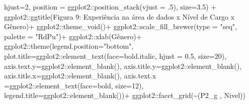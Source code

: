 \documentclass[
]{article}
\newenvironment{Shaded}{\begin{snugshade}}{\end{snugshade}}
\newcommand{\AttributeTok}[1]{\textcolor[rgb]{0.77,0.63,0.00}{#1}}
\newcommand{\DecValTok}[1]{\textcolor[rgb]{0.00,0.00,0.81}{#1}}
\newcommand{\FloatTok}[1]{\textcolor[rgb]{0.00,0.00,0.81}{#1}}
\newcommand{\FunctionTok}[1]{\textcolor[rgb]{0.00,0.00,0.00}{#1}}
\newcommand{\NormalTok}[1]{#1}
\newcommand{\SpecialCharTok}[1]{\textcolor[rgb]{0.00,0.00,0.00}{#1}}
\newcommand{\StringTok}[1]{\textcolor[rgb]{0.31,0.60,0.02}{#1}}
\begin{document}
\begin{Shaded}
\begin{Highlighting}[]
    \AttributeTok{hjust=}\DecValTok{2}\NormalTok{,}
    \AttributeTok{position =}\NormalTok{ ggplot2}\SpecialCharTok{::}\FunctionTok{position\_stack}\NormalTok{(}\AttributeTok{vjust =}\NormalTok{ .}\DecValTok{5}\NormalTok{),}
    \AttributeTok{size=}\FloatTok{3.5}\NormalTok{) }\SpecialCharTok{+}
\NormalTok{  ggplot2}\SpecialCharTok{::}\FunctionTok{ggtitle}\NormalTok{(}\StringTok{\textquotesingle{}Figura 9: Experiência na área de dados x Nível de Cargo x Gênero\textquotesingle{}}\NormalTok{)}\SpecialCharTok{+}
\NormalTok{  ggplot2}\SpecialCharTok{::}\FunctionTok{theme\_void}\NormalTok{()}\SpecialCharTok{+}
\NormalTok{  ggplot2}\SpecialCharTok{::}\FunctionTok{scale\_fill\_brewer}\NormalTok{(}\AttributeTok{type =} \StringTok{"seq"}\NormalTok{, }\AttributeTok{palette =} \StringTok{"RdPu"}\NormalTok{)}\SpecialCharTok{+}
\NormalTok{  ggplot2}\SpecialCharTok{::}\FunctionTok{xlab}\NormalTok{(}\StringTok{\textquotesingle{}Gênero\textquotesingle{}}\NormalTok{)}\SpecialCharTok{+}
\NormalTok{  ggplot2}\SpecialCharTok{::}\FunctionTok{theme}\NormalTok{(}\AttributeTok{legend.position=}\StringTok{"bottom"}\NormalTok{,}
                 \AttributeTok{plot.title=}\NormalTok{ggplot2}\SpecialCharTok{::}\FunctionTok{element\_text}\NormalTok{(}\AttributeTok{face=}\StringTok{\textquotesingle{}bold.italic\textquotesingle{}}\NormalTok{,}
                                                  \AttributeTok{hjust =} \FloatTok{0.5}\NormalTok{, }\AttributeTok{size=}\DecValTok{20}\NormalTok{),}
                 \AttributeTok{axis.text.y=}\NormalTok{ggplot2}\SpecialCharTok{::}\FunctionTok{element\_blank}\NormalTok{(),}
                 \AttributeTok{axis.title.y=}\NormalTok{ggplot2}\SpecialCharTok{::}\FunctionTok{element\_blank}\NormalTok{(),}
                 \AttributeTok{axis.title.x=}\NormalTok{ggplot2}\SpecialCharTok{::}\FunctionTok{element\_blank}\NormalTok{(),}
                 \AttributeTok{axis.text.x =}\NormalTok{ggplot2}\SpecialCharTok{::}\FunctionTok{element\_text}\NormalTok{(}\AttributeTok{face=}\StringTok{\textquotesingle{}bold\textquotesingle{}}\NormalTok{, }\AttributeTok{size=}\DecValTok{12}\NormalTok{),}
                 \AttributeTok{legend.title=}\NormalTok{ggplot2}\SpecialCharTok{::}\FunctionTok{element\_blank}\NormalTok{())}\SpecialCharTok{+}
\NormalTok{  ggplot2}\SpecialCharTok{::}\FunctionTok{facet\_grid}\NormalTok{(}\SpecialCharTok{\textasciitilde{}}\StringTok{\textasciigrave{}}\AttributeTok{(\textquotesingle{}P2\_g \textquotesingle{}, \textquotesingle{}Nivel\textquotesingle{})}\StringTok{\textasciigrave{}}\NormalTok{)}
\end{Highlighting}
\end{Shaded}
\end{document}

